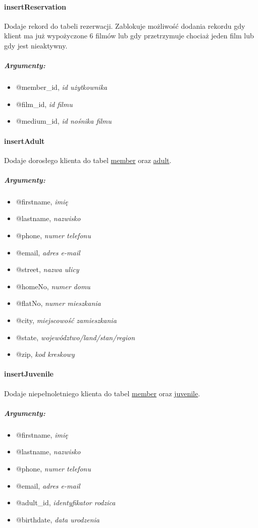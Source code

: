 \documentclass[12pt,a4paper,titlepage]{article}
\begin{document}
\paragraph{insertReservation}
Dodaje rekord do tabeli rezerwacji. Zablokuje możliwość dodania rekordu gdy klient ma już wypożyczone 6 filmów lub gdy przetrzymuje chociaż jeden film lub gdy jest nieaktywny.
\subparagraph{Argumenty:}
\begin{itemize}
	\item @member\_id, \textit{id użytkownika}
	\item @film\_id, \textit{id filmu}
	\item @medium\_id, \textit{id nośnika filmu}
\end{itemize}

\paragraph{insertAdult}
Dodaje dorosłego klienta do tabel \underline{member} oraz \underline{adult}.
\subparagraph{Argumenty:}
\begin{itemize}
	\item @firstname, \textit{imię}
	\item @lastname, \textit{nazwisko}
	\item @phone, \textit{numer telefonu}
	\item @email, \textit{adres e-mail}
	\item @street, \textit{nazwa ulicy}
	\item @homeNo, \textit{numer domu}
	\item @flatNo, \textit{numer mieszkania}
	\item @city, \textit{miejscowość zamieszkania}
	\item @state, \textit{województwo/land/stan/region}
	\item @zip, \textit{kod kreskowy}
\end{itemize}

\paragraph{insertJuvenile}
Dodaje niepełnoletniego klienta do tabel \underline{member} oraz \underline{juvenile}.
\subparagraph{Argumenty:}
\begin{itemize}
	\item @firstname, \textit{imię}
	\item @lastname, \textit{nazwisko}
	\item @phone, \textit{numer telefonu}
	\item @email, \textit{adres e-mail}
	\item @adult\_id, \textit{identyfikator rodzica}
	\item @birthdate, \textit{data urodzenia}
\end{itemize}
\end{document}
